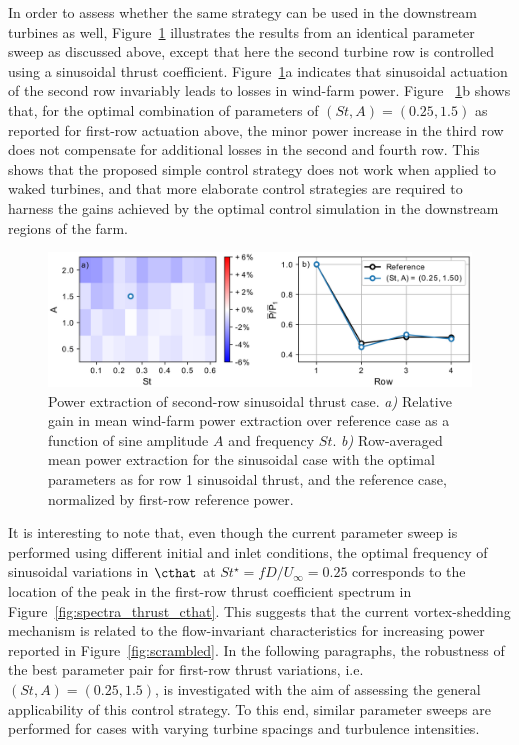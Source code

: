 In order to assess whether the same strategy can be used in the downstream turbines as well, Figure~\ref{fig:sinus_row2} illustrates the results from an identical parameter sweep as discussed above, except that here the second turbine row is controlled using a sinusoidal thrust coefficient. Figure~\ref{fig:sinus_row2}a indicates that sinusoidal actuation of the second row invariably leads to losses in wind-farm power. Figure ~\ref{fig:sinus_row2}b  shows that, for the optimal combination of parameters of  $(St, A) = (0.25, 1.5)$ as reported for first-row actuation above, the minor power increase in the third row does not compensate for additional losses in the second and fourth row. This shows that the proposed simple control strategy does not work when applied to waked turbines, and that more elaborate control strategies are required to harness the gains achieved by the optimal control simulation in the downstream regions of the farm. 
\begin{figure}
	\centering
	\includegraphics[width=\textwidth]{chapters/analysis_induction_control/gains_row22.eps}
	\caption[Power extraction of second-row sinusoidal thrust case.]{Power extraction of second-row sinusoidal thrust case. \emph{a) } Relative gain in mean wind-farm power extraction over reference case as a function of sine amplitude $A$ and frequency $St$. \emph{b) } Row-averaged mean power extraction for the sinusoidal case with the optimal parameters as for row 1 sinusoidal thrust, and the reference case, normalized by first-row reference power.\label{fig:sinus_row2} }
\end{figure}

It is interesting to note that, even though the current parameter sweep is performed using different initial and inlet conditions, the optimal frequency of sinusoidal variations in $\cthat$ at $St^\star = f D / U_\infty = 0.25$ corresponds to the location of the peak in the first-row thrust coefficient spectrum in Figure~\ref{fig:spectra_thrust_cthat}. This suggests that the current vortex-shedding mechanism is related to the flow-invariant characteristics for increasing power reported in Figure~\ref{fig:scrambled}. 
In the following paragraphs, the robustness of the best parameter pair for first-row thrust variations, i.e. $(St, A) = (0.25, 1.5)$, is investigated with the aim of assessing the general applicability of this control strategy. To this end, similar parameter sweeps are performed for cases with varying turbine spacings and turbulence intensities.


